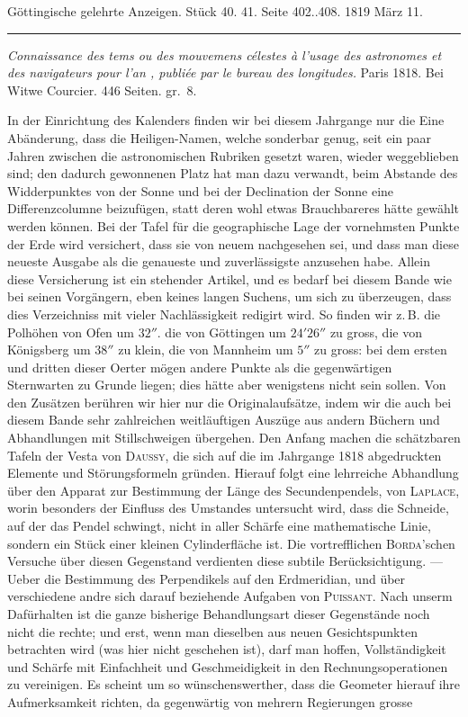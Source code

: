 \clearpage
{}
\begin{center}\small Göttingische gelehrte Anzeigen. Stück 40. 41. Seite 402..408. 1819 März 11.\\[3pt]\rule{.72\linewidth}{.3pt}\end{center}

\noindent\emph{Connaissance des tems ou des mouvemens célestes à l'usage des astronomes et des navigateurs pour l'an {}, publiée par le bureau des longitudes.} Paris 1818. Bei Witwe Courcier. 446 Seiten. gr.~8.

In der Einrichtung des Kalenders finden wir bei diesem Jahrgange nur die Eine Abänderung, dass die Heiligen-Namen, welche sonderbar genug, seit ein paar Jahren zwischen die astronomischen Rubriken gesetzt waren, wieder weggeblieben sind; den dadurch gewonnenen Platz hat man dazu verwandt, beim Abstande des Widderpunktes von der Sonne und bei der Declination der Sonne eine Differenzcolumne beizufügen, statt deren wohl etwas Brauchbareres hätte gewählt werden können. Bei der Tafel für die geographische Lage der vornehmsten Punkte der Erde wird versichert, dass sie von neuem nachgesehen sei, und dass man diese neueste Ausgabe als die genaueste und zuverlässigste anzusehen habe. Allein diese Versicherung ist ein stehender Artikel, und es bedarf bei diesem Bande wie bei seinen Vorgängern, eben keines langen Suchens, um sich zu überzeugen, dass dies Verzeichniss mit vieler Nachlässigkeit redigirt wird. So finden wir z.\,B. die Polhöhen von Ofen um $32''$. die von Göttingen um $24' 26''$ zu gross, die von Königsberg um $38''$ zu klein, die von Mannheim um $5''$ zu gross: bei dem ersten und dritten dieser Oerter mögen andere Punkte als die gegenwärtigen Sternwarten zu Grunde liegen; dies hätte aber wenigstens nicht sein sollen. Von den Zusätzen berühren wir hier nur die Originalaufsätze, indem wir die auch bei diesem Bande sehr zahlreichen weitläuftigen Auszüge aus andern Büchern und Abhandlungen mit Stillschweigen übergehen. Den Anfang machen die schätzbaren Tafeln der Vesta von \textsc{Daussy}, die sich auf die im Jahrgange 1818 abgedruckten Elemente und Störungsformeln gründen. Hierauf folgt eine lehrreiche Abhandlung über den Apparat zur Bestimmung der Länge des Secundenpendels, von \textsc{Laplace}, worin besonders der Einfluss des Umstandes untersucht wird, dass die Schneide, auf der das Pendel schwingt, nicht in aller Schärfe eine mathematische Linie, sondern ein Stück einer kleinen Cylinderfläche ist. Die vortrefflichen \textsc{Borda}'schen Versuche über diesen Gegenstand verdienten diese subtile Berücksichtigung. --- Ueber die Bestimmung des Perpendikels auf den Erdmeridian, und über verschiedene andre sich darauf beziehende Aufgaben von \textsc{Puissant}. Nach unserm Dafürhalten ist die ganze bisherige Behandlungsart dieser Gegenstände noch nicht die rechte; und erst, wenn man dieselben aus neuen Gesichtspunkten betrachten wird (was hier nicht geschehen ist), darf man hoffen, Vollständigkeit und Schärfe mit Einfachheit und Geschmeidigkeit in den Rechnungsoperationen zu vereinigen. Es scheint um so wünschenswerther, dass die Geometer hierauf ihre Aufmerksamkeit richten, da gegenwärtig von mehrern Regierungen grosse 